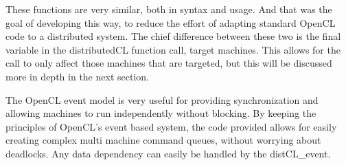\documentclass[../thesis.tex]{subfiles}
\begin{document}
        These functions are very similar, both in syntax and usage. And that was the goal of developing this way, to reduce the effort of adapting standard OpenCL code to a distributed system. The chief difference between these two is the final variable in the distributedCL function call, target machines. This allows for the call to only affect those machines that are targeted, but this will be discussed more in depth in the next section.

The OpenCL event model is very useful for providing synchronization and allowing machines to run independently without blocking. By keeping the principles of OpenCL's event based system, the code provided allows for easily creating complex multi machine command queues, without worrying about deadlocks. Any data dependency can easily be handled by the distCL\_event.

\end{document}
